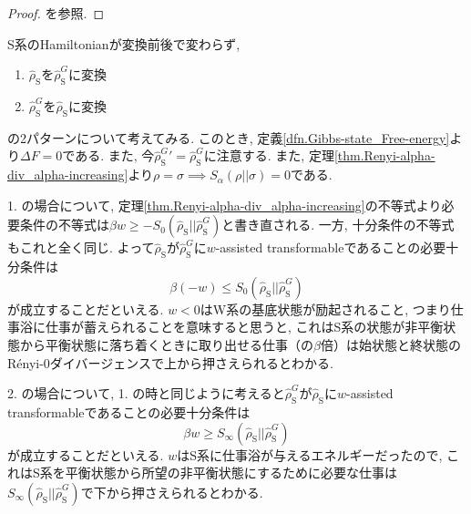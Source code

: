 \begin{proof}
  \cite{SagawaEntropy}を参照. 
\end{proof}

S系のHamiltonianが変換前後で変わらず, %
\begin{enumerate}
  \item $\hat{\rho}_{\text{S}}$を$\hat{\rho}_{\text{S}}^G$に変換
  \item $\hat{\rho}_{\text{S}}^G$を$\hat{\rho}_{\text{S}}$に変換
\end{enumerate}
の2パターンについて考えてみる. 
このとき, 定義\ref{dfn.Gibbs-state_Free-energy}より$\Delta F=0$である. 
また, 今$\hat{\rho}_{\text{S}}^{G}{}'=\hat{\rho}_{\text{S}}^{G}$に注意する. 
また, 定理\ref{thm.Renyi-alpha-div_alpha-increasing}より$\rho=\sigma\implies S_{\alpha}(\rho||\sigma)=0$である. 

1. の場合について, 定理\ref{thm.Renyi-alpha-div_alpha-increasing}の不等式より必要条件の不等式は$\beta w\geq -S_0(\hat{\rho}_{\text{S}}||\hat{\rho}_{\text{S}}^{G})$と書き直される. 
一方, 十分条件の不等式もこれと全く同じ. 
よって$\hat{\rho}_\text{S}$が$\hat{\rho}_\text{S}^G$に$w$-assisted transformableであることの必要十分条件は
\begin{equation}
  \beta (-w)\leq S_0(\hat{\rho}_{\text{S}}||\hat{\rho}_{\text{S}}^{G})
\end{equation}
が成立することだといえる. 
$w<0$はW系の基底状態が励起されること, つまり仕事浴に仕事が蓄えられることを意味すると思うと, これはS系の状態が非平衡状態から平衡状態に落ち着くときに取り出せる仕事（の$\beta$倍）は始状態と終状態のR\'{e}nyi-0ダイバージェンスで上から押さえられるとわかる. 

2. の場合について, 1. の時と同じように考えると$\hat{\rho}_\text{S}^G$が$\hat{\rho}_\text{S}$に$w$-assisted transformableであることの必要十分条件は
\begin{equation}
  \beta w\geq S_{\infty}(\hat{\rho}_{\text{S}}||\hat{\rho}_{\text{S}}^{G})
\end{equation}
が成立することだといえる. 
$w$はS系に仕事浴が与えるエネルギーだったので, これはS系を平衡状態から所望の非平衡状態にするために必要な仕事は$S_{\infty}(\hat{\rho}_{\text{S}}||\hat{\rho}_{\text{S}}^{G})$で下から押さえられるとわかる. 



